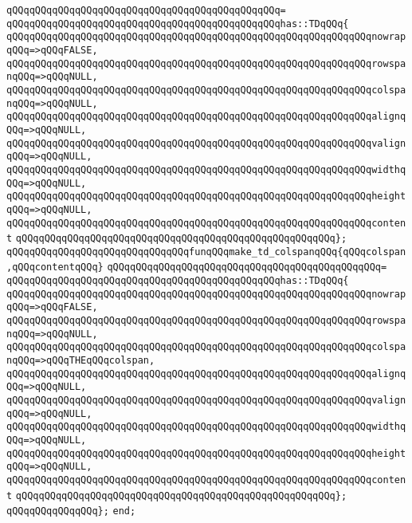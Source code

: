 \verb|qQQqqQQqqQQqqQQqqQQqqQQqqQQqqQQqqQQqqQQqqQQqqQQq=|\newline
\verb|qQQqqQQqqQQqqQQqqQQqqQQqqQQqqQQqqQQqqQQqqQQqqQQqhas::TDqQQq{|\newline
\verb|qQQqqQQqqQQqqQQqqQQqqQQqqQQqqQQqqQQqqQQqqQQqqQQqqQQqqQQqqQQqqQQqnowrapqQQq=>qQQqFALSE,|\newline
\verb|qQQqqQQqqQQqqQQqqQQqqQQqqQQqqQQqqQQqqQQqqQQqqQQqqQQqqQQqqQQqqQQqrowspanqQQq=>qQQqNULL,|\newline
\verb|qQQqqQQqqQQqqQQqqQQqqQQqqQQqqQQqqQQqqQQqqQQqqQQqqQQqqQQqqQQqqQQqcolspanqQQq=>qQQqNULL,|\newline
\verb|qQQqqQQqqQQqqQQqqQQqqQQqqQQqqQQqqQQqqQQqqQQqqQQqqQQqqQQqqQQqqQQqalignqQQq=>qQQqNULL,|\newline
\verb|qQQqqQQqqQQqqQQqqQQqqQQqqQQqqQQqqQQqqQQqqQQqqQQqqQQqqQQqqQQqqQQqvalignqQQq=>qQQqNULL,|\newline
\verb|qQQqqQQqqQQqqQQqqQQqqQQqqQQqqQQqqQQqqQQqqQQqqQQqqQQqqQQqqQQqqQQqwidthqQQq=>qQQqNULL,|\newline
\verb|qQQqqQQqqQQqqQQqqQQqqQQqqQQqqQQqqQQqqQQqqQQqqQQqqQQqqQQqqQQqqQQqheightqQQq=>qQQqNULL,|\newline
\verb|qQQqqQQqqQQqqQQqqQQqqQQqqQQqqQQqqQQqqQQqqQQqqQQqqQQqqQQqqQQqqQQqcontent|\newline
\verb|qQQqqQQqqQQqqQQqqQQqqQQqqQQqqQQqqQQqqQQqqQQqqQQqqQQqqQQq};|\newline
\newline
\verb|qQQqqQQqqQQqqQQqqQQqqQQqqQQqqQQqfunqQQqmake_td_colspanqQQq{qQQqcolspan,qQQqcontentqQQq}|\newline
\verb|qQQqqQQqqQQqqQQqqQQqqQQqqQQqqQQqqQQqqQQqqQQqqQQq=|\newline
\verb|qQQqqQQqqQQqqQQqqQQqqQQqqQQqqQQqqQQqqQQqqQQqqQQqhas::TDqQQq{|\newline
\verb|qQQqqQQqqQQqqQQqqQQqqQQqqQQqqQQqqQQqqQQqqQQqqQQqqQQqqQQqqQQqqQQqnowrapqQQq=>qQQqFALSE,|\newline
\verb|qQQqqQQqqQQqqQQqqQQqqQQqqQQqqQQqqQQqqQQqqQQqqQQqqQQqqQQqqQQqqQQqrowspanqQQq=>qQQqNULL,|\newline
\verb|qQQqqQQqqQQqqQQqqQQqqQQqqQQqqQQqqQQqqQQqqQQqqQQqqQQqqQQqqQQqqQQqcolspanqQQq=>qQQqTHEqQQqcolspan,|\newline
\verb|qQQqqQQqqQQqqQQqqQQqqQQqqQQqqQQqqQQqqQQqqQQqqQQqqQQqqQQqqQQqqQQqalignqQQq=>qQQqNULL,|\newline
\verb|qQQqqQQqqQQqqQQqqQQqqQQqqQQqqQQqqQQqqQQqqQQqqQQqqQQqqQQqqQQqqQQqvalignqQQq=>qQQqNULL,|\newline
\verb|qQQqqQQqqQQqqQQqqQQqqQQqqQQqqQQqqQQqqQQqqQQqqQQqqQQqqQQqqQQqqQQqwidthqQQq=>qQQqNULL,|\newline
\verb|qQQqqQQqqQQqqQQqqQQqqQQqqQQqqQQqqQQqqQQqqQQqqQQqqQQqqQQqqQQqqQQqheightqQQq=>qQQqNULL,|\newline
\verb|qQQqqQQqqQQqqQQqqQQqqQQqqQQqqQQqqQQqqQQqqQQqqQQqqQQqqQQqqQQqqQQqcontent|\newline
\verb|qQQqqQQqqQQqqQQqqQQqqQQqqQQqqQQqqQQqqQQqqQQqqQQqqQQqqQQq};|\newline
\verb|qQQqqQQqqQQqqQQq};|\newline
\verb|end;|\newline
\newline

